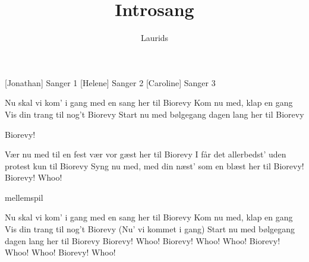 \documentclass[a4paper,11pt]{article}
\title{Introsang}
\author{Laurids}
\begin{document}
\maketitle

\begin{roles}
  [Jonathan] Sanger 1
  [Helene] Sanger 2
  [Caroline] Sanger 3
\end{roles}


\begin{center}
\end{center} 

\begin{song}
 Nu skal vi kom’ i gang
med en sang
her til Biorevy
 Kom nu med, klap en gang
Vis din trang
til nog’t Biorevy
 Start nu med bølgegang
dagen lang
her til Biorevy


 Biorevy!


 Vær nu med til en fest
vær vor gæst
her til Biorevy
 I får det allerbedst’
uden protest
kun til Biorevy
 Syng nu med, med din næst’
som en blæst
her til Biorevy!
 Biorevy!
Whoo!


\scene mellemspil


 Nu skal vi kom’ i gang
med en sang
her til Biorevy
Kom nu med, klap en gang
Vis din trang
til nog’t Biorevy
 (Nu' vi kommet i gang)
Start nu med bølgegang
dagen lang
her til Biorevy
 Biorevy!
Whoo!
Biorevy!
Whoo! Whoo!
Biorevy!
Whoo! Whoo!
Biorevy!
Whoo!

\end{song}
\end{document}
